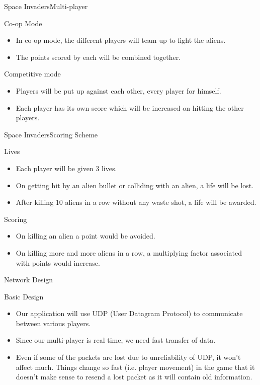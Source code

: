 \documentclass{beamer}
\begin{document}
\begin{frame}{Space Invaders}{Multi-player}
	\begin{block}{Co-op Mode}
	\begin{itemize}
		\item In co-op mode, the different players will team up to fight the aliens.
		\item The points scored by each will be combined together.
	\end{itemize}
	\end{block}
	\begin{block}{Competitive mode}
	\begin{itemize}
		\item Players will be put up against each other, every player for himself. 
		\item Each player has its own score which will be increased on hitting the other players.
	\end{itemize}  
	\end{block}
\end{frame}

\begin{frame}{Space Invaders}{Scoring Scheme}
	\begin{block}{Lives}
		\begin{itemize}
			\item Each player will be given 3 lives.
			\item On getting hit by an alien bullet or colliding with an alien, a life will be lost.
			\item After killing 10 aliens in a row without any waste shot, a life will be awarded.
		\end{itemize}
	\end{block}
	
	\begin{block}{Scoring}
		\begin{itemize}
			\item On killing an alien a point would be avoided.
			\item On killing more and more aliens in a row, a multiplying factor associated with points would increase.
		\end{itemize}
	\end{block}
\end{frame}


\begin{frame}{Network Design}{}
	\begin{block}{Basic Design}
		\begin{itemize}
			\item Our application will use UDP (User Datagram Protocol) to communicate between various players.
			\item Since our multi-player is real time, we need fast transfer of data.
			\item Even if some of the packets are lost due to unreliability of UDP, it won't affect much. Things change so fast (i.e. player movement) in the game that it doesn't make sense to resend a lost packet as it will contain old information.
		\end{itemize}
	\end{block}
\end{frame}
\end{document}
